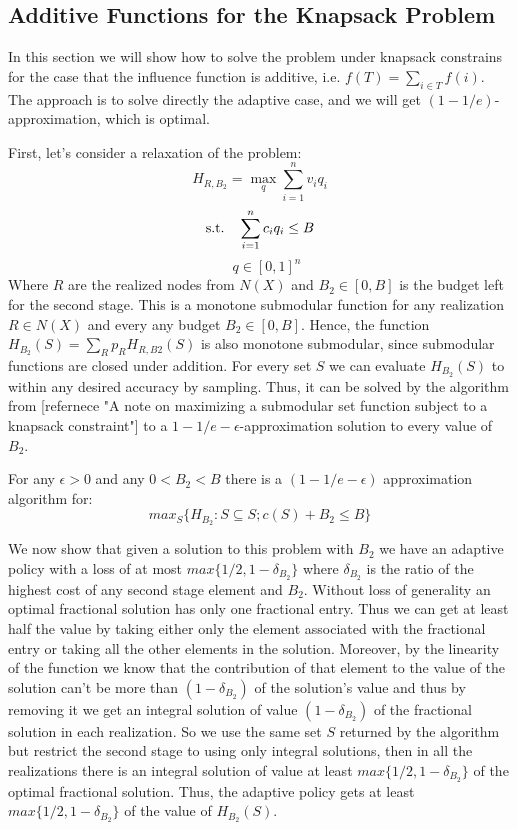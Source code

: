 \subsection{Additive Functions for the Knapsack Problem}\label{sec:additiveKnapsack}
In this section we will show how to solve the problem under knapsack constrains for the case that the influence function is additive, i.e. $f(T) = \sum_{i\in T}{f(i)}$. The approach is to solve directly the adaptive case, and we will get $(1-1/e)$-approximation, which is optimal.

First, let's consider a relaxation of the problem:
\[H_{R,B_2}=\max_{q} \sum_{i=1}^{n}{v_i q_i} \]
\[\textup{s.t.}\quad  \sum_{i=1}^{n}{c_i q_i} \le B \]
\[\quad q \in [0,1]^n \]
Where $R$ are the realized nodes from $N(X)$ and $B_2 \in [0,B]$ is the budget left for the second stage.
This is a monotone submodular function for any realization $R \in N(X)$ and every any budget $B_2 \in [0,B]$. Hence, the function $H_{B_2}(S) = \sum_R{p_R H_{R,B2}(S)}$ is also monotone submodular, since submodular functions are closed under addition. For every set $S$ we can evaluate $H_{B_2}(S)$ to within any desired accuracy by sampling. Thus, it can be solved by the algorithm from [refernece "A note on maximizing a submodular set function subject to a
knapsack constraint"] to a $1-1/e - \epsilon$-approximation solution to every value of $B_2$. 
\begin{lemma}
For any $\epsilon > 0$ and any $0 < B_2 < B$ there is a $(1 - 1/e - \epsilon)$ approximation algorithm for:
\[ max_S \{H_{B_2} : S \subseteq S ; c(S) + B_2 \le B\}\]
\end{lemma}
We now show that given a solution to this problem with $B_2$ we have an adaptive policy with a loss of at most $max\{1/2, 1 - \delta_{B_2}\}$ where $\delta_{B_2}$ is the ratio of the highest cost of any second stage element and $B_2$. Without loss of generality an optimal fractional solution has only one fractional entry. Thus we can get at least half the value by taking either only the element associated with the fractional entry or taking all the other elements in the solution. Moreover, by the linearity of the function we know that the contribution of that element to the value of the solution can’t be more than $(1 - \delta_{B_2})$ of the solution’s value and thus by removing it we get an integral solution of value $(1 - \delta_{B_2})$ of the fractional solution in each realization. So we use the same set $S$ returned by the algorithm but restrict the second stage to using only integral solutions, then in all the realizations there is an integral solution of
value at least $max\{1/2, 1 - \delta_{B_2}\}$ of the optimal fractional solution. Thus, the adaptive policy gets at least $max\{1/2, 1 - \delta_{B_2}\}$ of the value of $H_{B_2}(S)$.